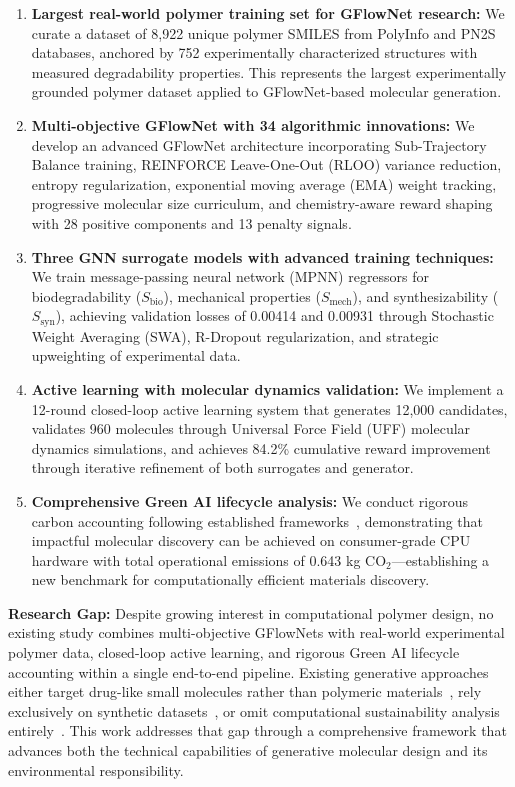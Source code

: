 \documentclass[twocolumn,10pt]{article}
\begin{document}
\begin{enumerate}[noitemsep,leftmargin=*]
  \item \textbf{Largest real-world polymer training set for GFlowNet research:} We curate a dataset of 8,922 unique polymer SMILES from PolyInfo and PN2S databases, anchored by 752 experimentally characterized structures with measured degradability properties. This represents the largest experimentally grounded polymer dataset applied to GFlowNet-based molecular generation.
  
  \item \textbf{Multi-objective GFlowNet with 34 algorithmic innovations:} We develop an advanced GFlowNet architecture incorporating Sub-Trajectory Balance training, REINFORCE Leave-One-Out (RLOO) variance reduction, entropy regularization, exponential moving average (EMA) weight tracking, progressive molecular size curriculum, and chemistry-aware reward shaping with 28 positive components and 13 penalty signals.
  
  \item \textbf{Three GNN surrogate models with advanced training techniques:} We train message-passing neural network (MPNN) regressors for biodegradability ($S_\text{bio}$), mechanical properties ($S_\text{mech}$), and synthesizability ($S_\text{syn}$), achieving validation losses of 0.00414 and 0.00931 through Stochastic Weight Averaging (SWA), R-Dropout regularization, and strategic upweighting of experimental data.
  
  \item \textbf{Active learning with molecular dynamics validation:} We implement a 12-round closed-loop active learning system that generates 12,000 candidates, validates 960 molecules through Universal Force Field (UFF) molecular dynamics simulations, and achieves 84.2\% cumulative reward improvement through iterative refinement of both surrogates and generator.
  
  \item \textbf{Comprehensive Green AI lifecycle analysis:} We conduct rigorous carbon accounting following established frameworks~\cite{lannelongue2021green}, demonstrating that impactful molecular discovery can be achieved on consumer-grade CPU hardware with total operational emissions of 0.643 kg CO$_2$—establishing a new benchmark for computationally efficient materials discovery.
\end{enumerate}

\noindent\textbf{Research Gap:} Despite growing interest in computational polymer design, no existing study combines multi-objective GFlowNets with real-world experimental polymer data, closed-loop active learning, and rigorous Green AI lifecycle accounting within a single end-to-end pipeline. Existing generative approaches either target drug-like small molecules rather than polymeric materials~\cite{bengio2021flow,jin2018junction}, rely exclusively on synthetic datasets~\cite{kuenneth2023pi1m}, or omit computational sustainability analysis entirely~\cite{zhou2019optimization}. This work addresses that gap through a comprehensive framework that advances both the technical capabilities of generative molecular design and its environmental responsibility.
\end{document}
